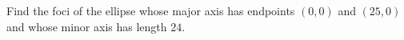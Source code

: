 Find the foci of the ellipse whose major axis has endpoints $(0,0)$ and $(25,0)$ and whose minor axis has length $24$.
